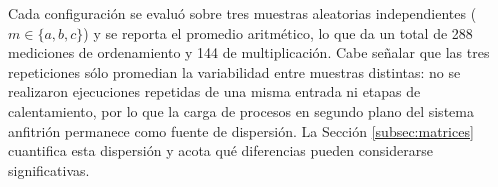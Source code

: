 Cada configuración se evaluó sobre tres muestras aleatorias independientes ($m \in \{a,b,c\}$) y se reporta el promedio aritmético, lo que da un total de 288 mediciones de ordenamiento y 144 de multiplicación. Cabe señalar que las tres repeticiones sólo promedian la variabilidad entre muestras distintas: no se realizaron ejecuciones repetidas de una misma entrada ni etapas de calentamiento, por lo que la carga de procesos en segundo plano del sistema anfitrión permanece como fuente de dispersión. La Sección \ref{subsec:matrices} cuantifica esta dispersión y acota qué diferencias pueden considerarse significativas.
